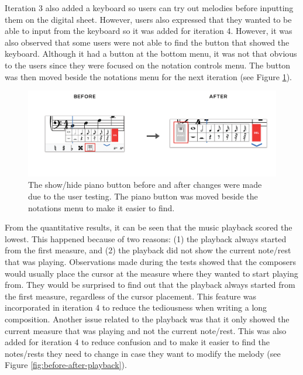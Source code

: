 			Iteration 3 also added a keyboard so users can try out melodies before inputting them on the digital sheet. However, users also expressed that they wanted to be able to input from the keyboard so it was added for iteration 4. However, it was also observed that some users were not able to find the button that showed the keyboard. Although it had a button at the bottom menu, it was not that obvious to the users since they were focused on the notation controls menu. The button was then moved beside the notations menu for the next iteration (see Figure \ref{fig:before-after-pianobtn}). 

			\begin{figure}[h]
				\centering
				\includegraphics[scale=0.25]{figures/before-after-pianobtn.png}
			    \caption{The show/hide piano button before and after changes were made due to the user testing. The piano button was moved beside the notations menu to make it easier to find.}
			    \label{fig:before-after-pianobtn}
			\end{figure}

			From the quantitative results, it can be seen that the music playback scored the lowest. This happened because of two reasons: (1) the playback always started from the first measure, and (2) the playback did not show the current note/rest that was playing. Observations made during the tests showed that the composers would usually place the cursor at the measure where they wanted to start playing from. They would be surprised to find out that the playback always started from the first measure, regardless of the cursor placement. This feature was incorporated in iteration 4 to reduce the tediousness when writing a long composition. Another issue related to the playback was that it only showed the current measure that was playing and not the current note/rest. This was also added for iteration 4 to reduce confusion and to make it easier to find the notes/rests they need to change in case they want to modify the melody (see Figure \ref{fig:before-after-playback}). 

